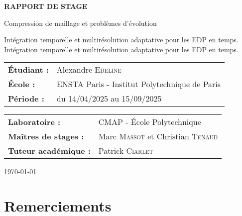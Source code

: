 \documentclass[11pt]{article}
\theoremstyle{definition}
\theoremstyle{remark}
\newcommand{\authorname}{Alexandre \textsc{Edeline}}
\newcommand{\studentschool}{ENSTA Paris - Institut Polytechnique de Paris}
\newcommand{\companyname}{CMAP - École Polytechnique}
\newcommand{\supervisor}{Marc \textsc{Massot} et Christian \textsc{Tenaud}}
\newcommand{\academicsupervisor}{Patrick \textsc{Ciarlet}}
\newcommand{\internshipperiod}{du 14/04/2025 au 15/09/2025}
\newcommand{\reporttitle}{Compression de maillage et problèmes d'évolution}
\newcommand{\reportsubtitle}{Intégration temporelle et multirésolution adaptative pour les EDP en temps.}
\begin{document}
\begin{titlepage}
    \centering
    
    
    \vspace{2cm}
    
    {\LARGE \textbf{RAPPORT DE STAGE}}
    
    \vspace{1cm}
    
    {\Large \reporttitle}
    
    \ifx\reportsubtitle\empty
    \else
        \vspace{0.5cm}
        {\large \reportsubtitle}
    \fi
    
    \vspace{2cm}
    
    \begin{tabular}{ll}
        \textbf{Étudiant :} & \authorname \\
        \textbf{École :} & \studentschool \\
        \textbf{Période :} & \internshipperiod \\
    \end{tabular}
    
    \vspace{2cm}
    
    \begin{tabular}{ll}
        \textbf{Laboratoire :} & \companyname \\
        \textbf{Maîtres de stages :} & \supervisor \\
        \textbf{Tuteur académique :} & \academicsupervisor \\
    \end{tabular}
    
    \vfill
    
    
    \vspace{1cm}
    
    {\large \today}
    
\end{titlepage}

\newpage
\thispagestyle{empty}
\mbox{}

\newpage
\section*{Remerciements}
\end{document}
